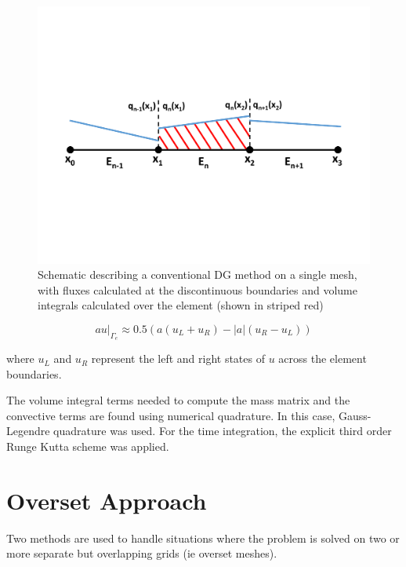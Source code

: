 \documentclass[11pt]{article}
\begin{document}
\begin{figure}[h]
\centering
  \includegraphics[width=\textwidth,trim={0 8cm 0  7cm},clip]{Figures/DGDiagram.pdf}
  \caption{Schematic describing a conventional DG method on a single mesh, with fluxes calculated at the discontinuous boundaries and volume integrals calculated over the element (shown in striped red)}
  \label{fig:dg}
\end{figure}

\begin{equation}
a u|_{\Gamma_e} \approx 0.5( a (u_L + u_R) - |a| (u_R-u_L))
\label{eq:upwind}
\end{equation} 

\noindent where $u_L$ and $u_R$ represent the left and right states of $u$ across
the element boundaries. 

The volume integral terms needed to compute the mass matrix and the convective
terms are found using numerical quadrature. In this case, Gauss-Legendre quadrature
was used. For the time integration, the explicit third order Runge Kutta scheme
was applied.  

\section{Overset Approach}

Two methods are used to handle situations where the problem is solved on two or more
separate but overlapping grids (ie overset meshes). 
\end{document}
